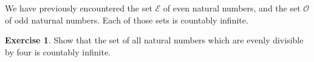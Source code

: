 \documentclass[12pt,letterpaper]{article}
\theoremstyle{definition}
\newtheorem{exercise}[question]{Exercise}
\begin{document}
We have previously encountered the set $\mathcal{E}$ of even natural numbers, and the set $\mathcal{O}$ of odd naturnal numbers.
Each of those sets is countably infinite.

\begin{exercise}
Show that the set of all natural numbers which are evenly divisible by four is countably infinite.
\end{exercise}


\end{document}
